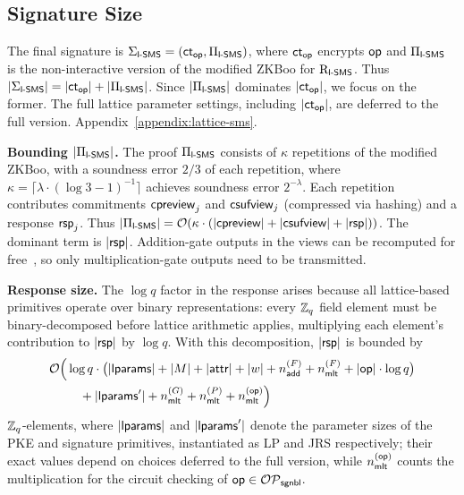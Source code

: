 \subsection{Signature Size}
\label{subsection:lattice-sms-signature-size}

The final \SMS signature is
$\Sigma_{\mathsf{l}\textsf{-}\mathsf{SMS}} = (\mathsf{ct}_\mathsf{op}, \Pi_{\mathsf{l}\textsf{-}\mathsf{SMS}})$,
where $\mathsf{ct}_\mathsf{op}$ encrypts $\mathsf{op}$ and $\Pi_{\mathsf{l}\textsf{-}\mathsf{SMS}}$ is the non-interactive
version of the modified ZKBoo for $\mathrm{R}_{\mathsf{l}\textsf{-}\mathsf{SMS}}$.
Thus $|\Sigma_{\mathsf{l}\textsf{-}\mathsf{SMS}}| = |\mathsf{ct}_\mathsf{op}| + |\Pi_{\mathsf{l}\textsf{-}\mathsf{SMS}}|$.
Since $|\Pi_{\mathsf{l}\textsf{-}\mathsf{SMS}}|$ dominates $|\mathsf{ct}_\mathsf{op}|$, we focus on the former.
The full lattice parameter settings, including $|\mathsf{ct}_\mathsf{op}|$,
are deferred to \ifcameraready the full version.
\else Appendix~\ref{appendix:lattice-sms}.\fi

\medskip
\noindent\textbf{Bounding $|\Pi_{\mathsf{l}\textsf{-}\mathsf{SMS}}|$.}
The proof $\Pi_{\mathsf{l}\textsf{-}\mathsf{SMS}}$ consists of $\kappa$ repetitions of the modified ZKBoo, with a soundness error $2/3$ of each repetition,
where $\kappa = \lceil \lambda \cdot (\log 3 - 1)^{-1} \rceil$
achieves soundness error $2^{-\lambda}$.
Each repetition contributes commitments $\mathsf{cpreview}_j$ and $\mathsf{csufview}_j$
(compressed via hashing) and a response $\mathsf{rsp}_j$.
Thus $|\Pi_{\mathsf{l}\textsf{-}\mathsf{SMS}}| = \mathcal{O}(\kappa \cdot (|\mathsf{cpreview}| + |\mathsf{csufview}| + |\mathsf{rsp}|))$.
The dominant term is $|\mathsf{rsp}|$.
Addition-gate outputs in the views can be recomputed for free~\cite{CCS:CDGORR17,CCS:KatKolWan18},
so only multiplication-gate outputs need to be transmitted.

\medskip
\noindent\textbf{Response size.}
The $\log q$ factor in the response arises because all lattice-based primitives
operate over binary representations:
every $\mathbb{Z}_q$ field element must be binary-decomposed before lattice arithmetic applies,
multiplying each element's contribution to $|\mathsf{rsp}|$ by $\log q$.
With this decomposition, $|\mathsf{rsp}|$ is bounded by
\begin{equation}\label{equation:lattice-sms-response-size}
\begin{aligned}
\mathcal{O}\Bigl(
&\log q \cdot
\bigl(|\mathsf{lparams}| + |M| + |\mathsf{attr}| + |w|
+ n_\mathsf{add}^{(F)} + n_\mathsf{mlt}^{(F)} + |\mathsf{op}| \cdot \log q\bigr)
\\
&\quad + |\mathsf{lparams}'| + n_\mathsf{mlt}^{(G)} + n_\mathsf{mlt}^{(P)} + n_\mathsf{mlt}^{(\mathsf{op})}
\Bigr)
\end{aligned}
\end{equation}
$\mathbb{Z}_q$-elements, where 
$|\mathsf{lparams}|$ and $|\mathsf{lparams}'|$
denote the parameter sizes of the PKE and signature primitives, instantiated as LP and JRS respectively; their exact values depend on choices deferred to the full version,
while $n_\mathsf{mlt}^{(\mathsf{op})}$ counts the multiplication for
the circuit checking of $\mathsf{op} \in \mathcal{OP}_\mathsf{sgnbl}$.

